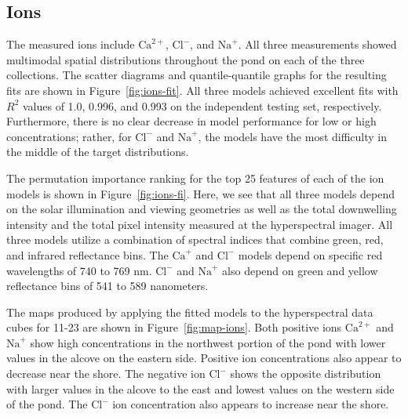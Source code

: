 \documentclass[remotesensing,article,submit,pdftex,moreauthors]{Definitions/mdpi}
\begin{document}
\pagebreak

\subsection{Ions}

The measured ions include $\mathrm{Ca}^{2+}$, $\mathrm{Cl}^{-}$, and $\mathrm{Na}^{+}$. All three measurements showed multimodal spatial distributions throughout the pond on each of the three collections. The scatter diagrams and quantile-quantile graphs for the resulting fits are shown in Figure~\ref{fig:ions-fit}. All three models achieved excellent fits with $R^2$ values of 1.0, 0.996, and 0.993 on the independent testing set, respectively. Furthermore, there is no clear decrease in model performance for low or high concentrations; rather, for $\textrm{Cl}^{-}$ and $\textrm{Na}^{+}$, the models have the most difficulty in the middle of the target distributions. 

The permutation importance ranking for the top 25 features of each of the ion models is shown in Figure~\ref{fig:ions-fi}. Here, we see that all three models depend on the solar illumination and viewing geometries as well as the total downwelling intensity and the total pixel intensity measured at the hyperspectral imager. All three models utilize a combination of spectral indices that combine green, red, and infrared reflectance bins. The $\textrm{Ca}^{+}$ and $\textrm{Cl}^{-}$ models depend on specific red wavelengths of 740 to 769 nm. $\textrm{Cl}^{-}$ and $\textrm{Na}^{+}$ also depend on green and yellow reflectance bins of 541 to 589 nanometers.

The maps produced by applying the fitted models to the hyperspectral data cubes for 11-23 are shown in Figure~\ref{fig:map-ions}. Both positive ions $\mathrm{Ca}^{2+}$ and $\mathrm{Na}^{+}$ show high concentrations in the northwest portion of the pond with lower values in the alcove on the eastern side. Positive ion concentrations also appear to decrease near the shore. The negative ion $\mathrm{Cl}^{-}$ shows the opposite distribution with larger values in the alcove to the east and lowest values on the western side of the pond. The $\mathrm{Cl}^{-}$ ion concentration also appears to increase near the shore.
\end{document}
